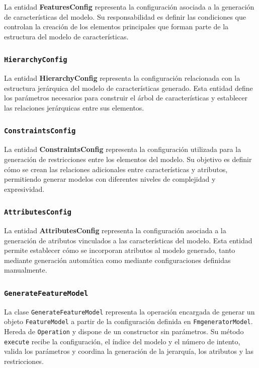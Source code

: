 La entidad \textbf{FeaturesConfig} representa la configuración asociada a la generación de características del modelo. Su responsabilidad es definir las condiciones que controlan la creación de los elementos principales que forman parte de la estructura del modelo de características.

\subsubsection*{\texttt{HierarchyConfig}}

La entidad \textbf{HierarchyConfig} representa la configuración relacionada con la estructura jerárquica del modelo de características generado. Esta entidad define los parámetros necesarios para construir el árbol de características y establecer las relaciones jerárquicas entre sus elementos.

\subsubsection*{\texttt{ConstraintsConfig}}

La entidad \textbf{ConstraintsConfig} representa la configuración utilizada para la generación de restricciones entre los elementos del modelo. Su objetivo es definir cómo se crean las relaciones adicionales entre características y atributos, permitiendo generar modelos con diferentes niveles de complejidad y expresividad.

\subsubsection*{\texttt{AttributesConfig}}

La entidad \textbf{AttributesConfig} representa la configuración asociada a la generación de atributos vinculados a las características del modelo. Esta entidad permite establecer cómo se incorporan atributos al modelo generado, tanto mediante generación automática como mediante configuraciones definidas manualmente.

\subsubsection*{\texttt{GenerateFeatureModel}}

La clase \texttt{GenerateFeatureModel} representa la operación encargada
de generar un objeto \texttt{FeatureModel} a partir de la configuración
definida en \texttt{FmgeneratorModel}. Hereda de \texttt{Operation} y
dispone de un constructor sin parámetros. Su método \texttt{execute}
recibe la configuración, el índice del modelo y el número de intento,
valida los parámetros y coordina la generación de la jerarquía, los
atributos y las restricciones.

